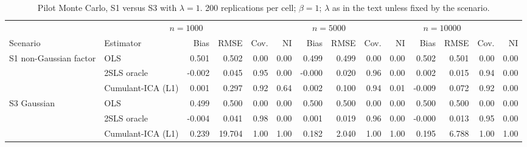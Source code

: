 \begin{table}[ht]
\centering
\scriptsize
\setlength{\tabcolsep}{2.5pt}
\caption{Pilot Monte Carlo, S1 versus S3 with $\lambda=1$.  200 replications per cell; $\beta=1$; $\lambda$ as in the text unless fixed by the scenario.}\label{tab:pilot-lam1}
\begin{tabular}{@{}llrrrrrrrrrrrr@{}}
\toprule
 & \multicolumn{4}{c}{$n=1000$} & \multicolumn{4}{c}{$n=5000$} & \multicolumn{4}{c}{$n=10000$} \\
\cmidrule(lr){3-6} \cmidrule(lr){7-10} \cmidrule(lr){11-14}
Scenario & Estimator & Bias & RMSE & Cov. & NI & Bias & RMSE & Cov. & NI & Bias & RMSE & Cov. & NI \\
\midrule
S1 non-Gaussian factor & OLS & 0.501 & 0.502 & 0.00 & 0.00 & 0.499 & 0.499 & 0.00 & 0.00 & 0.502 & 0.501 & 0.00 & 0.00 \\
 & 2SLS oracle & -0.002 & 0.045 & 0.95 & 0.00 & -0.000 & 0.020 & 0.96 & 0.00 & 0.002 & 0.015 & 0.94 & 0.00 \\
 & Cumulant-ICA (L1) & 0.001 & 0.297 & 0.92 & 0.64 & 0.002 & 0.100 & 0.94 & 0.01 & -0.009 & 0.072 & 0.92 & 0.00 \\
\addlinespace
S3 Gaussian & OLS & 0.499 & 0.500 & 0.00 & 0.00 & 0.500 & 0.500 & 0.00 & 0.00 & 0.500 & 0.500 & 0.00 & 0.00 \\
 & 2SLS oracle & -0.004 & 0.041 & 0.98 & 0.00 & 0.001 & 0.019 & 0.96 & 0.00 & -0.000 & 0.013 & 0.95 & 0.00 \\
 & Cumulant-ICA (L1) & 0.239 & 19.704 & 1.00 & 1.00 & 0.182 & 2.040 & 1.00 & 1.00 & 0.195 & 6.788 & 1.00 & 1.00 \\
\bottomrule
\end{tabular}
\end{table}
